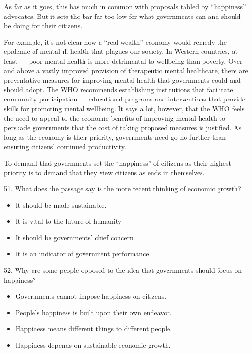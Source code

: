 \documentclass[UTF8,11pt]{ctexart}
\begin{document}
As far as it goes, this has much in common with proposals tabled by “happiness” advocates. But it sets the bar far too low for what governments can and should be doing for their citizens.


For example, it’s not clear how a “real wealth” economy would remedy the epidemic of mental ill-health that plagues our society. In Western countries, at least — poor mental health is more detrimental to wellbeing than poverty. Over and above a vastly improved provision of therapeutic mental healthcare, there are preventative measures for improving mental health that governments could and should adopt. The WHO recommends establishing institutions that facilitate community participation — educational programs and interventions that provide skills for promoting mental wellbeing. It says a lot, however, that the WHO feels the need to appeal to the economic benefits of improving mental health to persuade governments that the cost of taking proposed measures is justified. As long as the economy is their priority, governments need go no further than ensuring citizens’ continued productivity.


To demand that governments set the “happiness” of citizens as their highest priority is to demand that they view citizens as ends in themselves.


51. What does the passage say is the more recent thinking of economic growth?


\begin{itemize}[leftmargin=2em,itemsep=.2em,topsep=.4em]\item[A.] It should be made sustainable.
\item[B.] It is vital to the future of humanity
\item[C.] It should be governments’ chief concern.
\item[D.] It is an indicator of government performance.
\end{itemize}

52. Why are some people opposed to the idea that governments should focus on happiness?


\begin{itemize}[leftmargin=2em,itemsep=.2em,topsep=.4em]\item[A.] Governments cannot impose happiness on citizens.
\item[B.] People’s happiness is built upon their own endeavor.
\item[C.] Happiness means different things to different people.
\item[D.] Happiness depends on sustainable economic growth.
\end{itemize}
\end{document}
